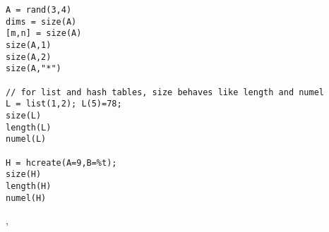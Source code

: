 \begin{examples}
\begin{Verbatim}
A = rand(3,4)
dims = size(A)
[m,n] = size(A)
size(A,1)
size(A,2)
size(A,"*")

// for list and hash tables, size behaves like length and numel
L = list(1,2); L(5)=78; 
size(L)
length(L)
numel(L)

H = hcreate(A=9,B=%t);
size(H)
length(H)
numel(H)
\end{Verbatim}
\end{examples}

\begin{manseealso}
  ,  
\end{manseealso}

